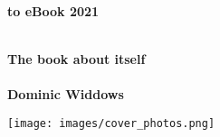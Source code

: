 
\thispagestyle{empty}

\vspace{3cm}
  \begin{center}
	\bfseries \sffamily \Huge \latex to eBook 2021 \par
        ~\\
	\bfseries \LARGE The book about itself \\ 
        ~\\
        \bfseries \Large Dominic Widdows \par

	\texttt{[image: images/cover\_photos.png]}
     \end{center}
    
\par

\newpage
